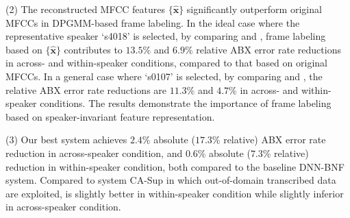 \documentclass[a4paper]{article}
\def\X#1{%
        \raisebox{.9pt}{\textcircled{\raisebox{-.9pt}{#1}}}%
}
\begin{document}
(2) The reconstructed MFCC features $\{\bm{\hat{x}}\}$ significantly outperform original MFCCs in DPGMM-based frame labeling. 
In the ideal case  where the representative speaker `s4018'  is  selected, by comparing \X5 and \X1,  frame labeling based on $\{\bm{\hat{x}}\}$ contributes to  $13.5\%$ and $6.9\%$ relative ABX error rate reductions in across- and within-speaker conditions, compared to that based on original MFCCs. 
In a general case where `s0107' is selected, by comparing \X3 and \X1, the relative ABX error rate reductions are  $11.3\%$ and $4.7\%$ in across- and within-speaker conditions.
The results demonstrate the importance of  frame labeling based on speaker-invariant feature representation.


(3) Our best system \X5 achieves $2.4\%$ absolute ($17.3\%$ relative) ABX error rate reduction in across-speaker condition, and $0.6\%$ absolute ($7.3\%$ relative) reduction in within-speaker condition, both compared to the baseline DNN-BNF system. 
Compared to system CA-Sup in which out-of-domain transcribed data are exploited,  \X5 is slightly better in within-speaker condition while slightly inferior in across-speaker condition.  

\end{document}
